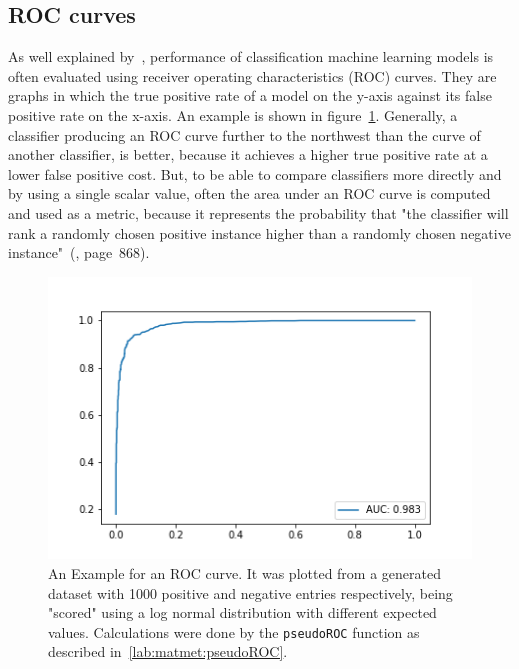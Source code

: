 	\subsection{ROC curves}
	\label{lab:background:roc}
	As well explained by~\citet{Fawcett2006}, performance of classification machine learning models is often evaluated using receiver operating characteristics (ROC) curves. They are graphs in which the true positive rate of a model on the y-axis against its false positive rate on the x-axis. An example is shown in figure~\ref{fig:roc_example}. Generally, a classifier producing an ROC curve further to the northwest than the curve of another classifier,	is better, because it achieves a higher true positive rate at a lower false positive cost. But, to be able to compare classifiers more directly and by using a single scalar value, often the area under an ROC curve is computed and used as a metric, because it represents the probability that "the classifier will rank a randomly chosen positive instance higher than a randomly chosen negative instance"~(\cite{Fawcett2006}, page~868).
	\renewcommand{\baselinestretch}{0.9}
	\begin{figure}
		\normalsize
		\centering
		\includegraphics[width = \textwidth]{figures/ROC.png}
		\caption[Example for an ROC curve]{An Example for an ROC curve. It was plotted from a generated dataset with 1000 positive and negative entries respectively, being "scored" using a log normal distribution with different expected values. Calculations were done by the \texttt{pseudoROC} function as described in~\ref{lab:matmet:pseudoROC}.}
		\label{fig:roc_example}
	\end{figure}
	\renewcommand{\baselinestretch}{1}\\
